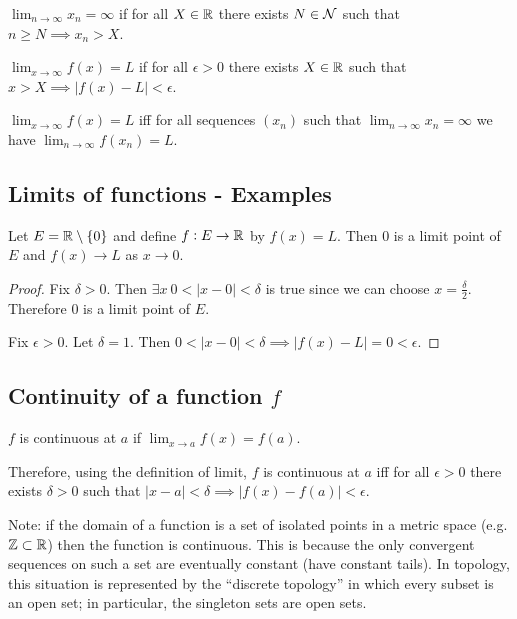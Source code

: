 \begin{definition*}
  $\lim_{n \to \infty} x_n = \infty$ if for all $X \in \mathbb{R}$ there exists $N \in \mathcal{N}$ such that
  $n \geq N \implies x_n > X$.
\end{definition*}

\begin{definition*}
  $\lim_{x \to \infty} f(x) = L$ if for all $\epsilon > 0$ there exists $X \in \mathbb{R}$ such that
  $x > X \implies |f(x) - L| < \epsilon$.
\end{definition*}

\begin{theorem*}
  $\lim_{x \to \infty} f(x) = L$ iff for all sequences $(x_n)$ such that
  $\lim_{n \to \infty}x_n = \infty$ we have $\lim_{n \to \infty} f(x_n) = L$.
\end{theorem*}

\subsection{Limits of functions - Examples}

\begin{example}
  Let $E = \mathbb{R}\setminus \{0\}$ and define $f:E \to \mathbb{R}$ by $f(x) = L$. Then 0 is a limit point of
  $E$ and $f(x) \to L$ as $x \to 0$.
\end{example}

\begin{proof}
  Fix $\delta > 0$. Then $\exists x ~ 0 < |x - 0| < \delta$ is true since we can choose
  $x = \frac{\delta}{2}$. Therefore 0 is a limit point of $E$.

  Fix $\epsilon > 0$. Let $\delta = 1$. Then
  $0 < |x - 0| < \delta \implies |f(x) - L| = 0 < \epsilon$.
\end{proof}

\subsection{Continuity of a function $f$}

\begin{definition*}
  $f$ is continuous at $a$ if $\lim_{x \to a} f(x) = f(a)$.
\end{definition*}

Therefore, using the definition of limit, $f$ is continuous at $a$ iff for all $\epsilon > 0$ there
exists $\delta > 0$ such that $|x - a| < \delta \implies |f(x) - f(a)| < \epsilon$.

Note: if the domain of a function is a set of isolated points in a metric space (e.g. $\mathbb{Z} \subset \mathbb{R}$) then the
function is continuous. This is because the only convergent sequences on such a set are eventually constant
(have constant tails). In topology, this situation is represented by the ``discrete topology​'' in which every
subset is an open set; in particular, the singleton sets are open sets.

